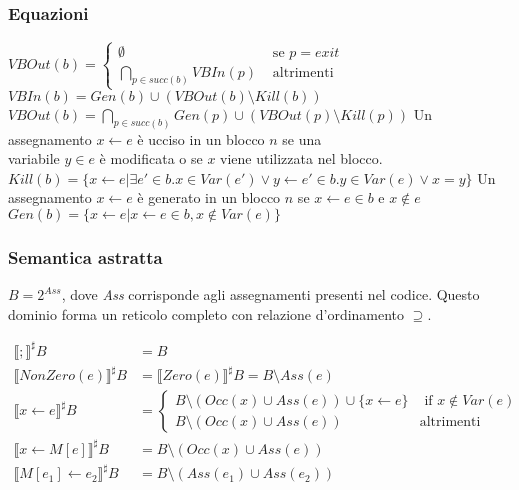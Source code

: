 \documentclass[a4paper, 10pt]{book}
\begin{document}
\subsubsection{Equazioni}
$VBOut(b) = 
	\begin{cases}
		\emptyset &\text{ se } p = exit \\
		\bigcap\limits_{p \in succ(b)} VBIn(p) &\text{ altrimenti}
	\end{cases}$
\newline\newline
$VBIn(b) = Gen(b) \cup (VBOut(b)\setminus Kill(b))$
\newline\newline
$VBOut(b) = \bigcap\limits_{p\in succ(b)} Gen(p) \cup (VBOut(p)\setminus Kill(p))$
\newline\newline\noindent
Un assegnamento $x \gets e$ è ucciso in un blocco $n$ se una  \\ variabile $y \in e$ è modificata o se 
$x$ viene utilizzata nel blocco.
\newline\newline
$Kill(b) = \{x \gets e | \exists e'\in b.x \in Var(e') \lor y \gets e' \in b.y \in Var(e) \lor x=y\}$
\newline\newline\noindent
Un assegnamento $x \gets e$ è generato in un blocco $n$ se $x \gets e \in b$ e $x \notin e$
\newline\newline
$Gen(b) = \{x \gets e | x \gets e \in b, x \notin Var(e)\}$

\subsubsection{Semantica astratta}
$B = 2^{Ass}$, dove \emph{Ass} corrisponde agli assegnamenti presenti nel codice. Questo dominio forma un
reticolo completo con relazione d'ordinamento $\supseteq$.

\begin{align*}
	\llbracket ; \rrbracket^\sharp B &= B\\
	\llbracket NonZero(e) \rrbracket^\sharp B &= \llbracket Zero(e) \rrbracket^\sharp B = B \setminus Ass(e)\\
	\llbracket x\gets e \rrbracket^\sharp B &= \begin{cases}
		B\setminus (Occ(x) \cup Ass(e)) \cup \{x\gets e \} & \text{ if } x\notin Var(e) \\
		B\setminus (Occ(x) \cup Ass(e)) & \text{altrimenti}
	\end{cases} \\
	\llbracket x \gets M[e] \rrbracket^\sharp B &= B\setminus (Occ(x) \cup Ass(e)) \\
	\llbracket M[e_1] \gets e_2 \rrbracket^\sharp B &= B\setminus (Ass(e_1) \cup Ass(e_2))
\end{align*}
\end{document}
